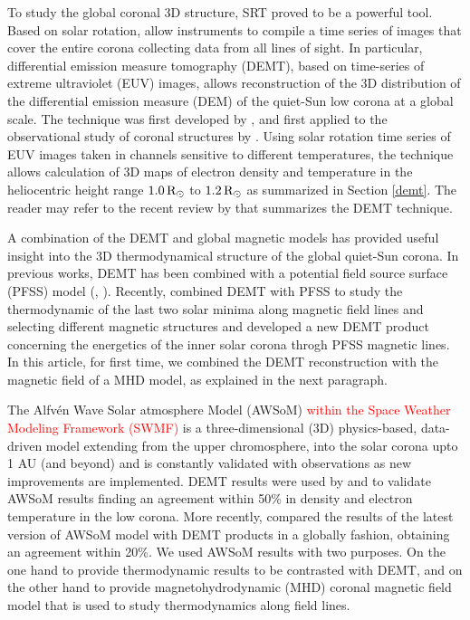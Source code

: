 \documentclass[namedreferences]{solarphysics}
\newcommand{\mrsun}{{\rm R_\odot}}
\def\diego#1{\textcolor{red}{#1}}
\def\notebyalbert#1{\textcolor{blue}{NOTE: #1}}
\begin{document}
\begin{article}

{To study the global coronal 3D structure, SRT proved to be a powerful tool. Based on solar rotation, allow instruments to compile a time series of images that cover the entire corona collecting data from all lines of sight.} In particular, differential emission measure tomography (DEMT), based on time-series of extreme ultraviolet (EUV) images, allows reconstruction of the 3D distribution of the differential emission measure (DEM) of the {quiet-Sun low corona at a global scale.} The technique was first developed by \citet{frazin_2009}, and first applied to the observational study of coronal structures by \citet{vasquez_2009}. Using solar rotation time series of EUV images taken in channels sensitive to different temperatures, the technique allows calculation of 3D maps of electron density and temperature in the heliocentric height range $1.0\,\mrsun$ to $1.2\,\mrsun$ as summarized in Section \ref{demt}. The reader may refer to the recent review by \citet{vasquez_2016} that summarizes the DEMT technique.


A combination of the DEMT and global magnetic models has provided useful insight into the 3D thermodynamical structure of the global quiet-Sun corona. In previous works, DEMT has been combined with a potential field source surface (PFSS) model  (\citet{huang_2012}, \citet{nuevo_2013}). Recently, \citet{lloveras_2017} combined DEMT with PFSS to study the thermodynamic of the last two solar minima along magnetic field lines and selecting different magnetic structures and \citet{maccormack_2017} developed a new DEMT product concerning the energetics of the inner solar corona throgh PFSS magnetic lines. In this article, for first time, we combined the DEMT reconstruction with the magnetic field of a MHD model, as explained in the next paragraph.


{The Alfv\'{e}n Wave Solar atmosphere Model (AWSoM) \diego{within the Space Weather Modeling Framework (SWMF)} is a three-dimensional (3D) physics-based, data-driven model extending from the upper chromosphere, into the solar corona upto 1 AU (and beyond) \citep{vander_2010, Van2014} and is constantly validated with observations as new improvements are implemented. DEMT results were used by \citet{jin_2012} and \citet{oran_2015} to validate AWSoM results finding an agreement within 50\% in density and electron temperature in the low corona. More recently, \citet{sachdeva_2019} compared the results of the latest version of AWSoM model with DEMT products in a globally fashion, obtaining an agreement within 20\%.
We used AWSoM results with two purposes. On the one hand to provide thermodynamic results to be contrasted with DEMT, and on the other hand to provide magnetohydrodynamic (MHD) coronal magnetic field model that is used to study thermodynamics along field lines.
}


\end{article}
\end{document}
